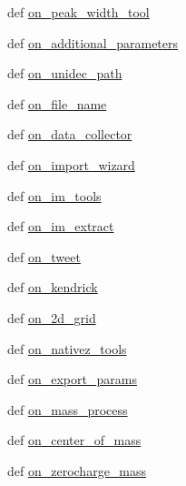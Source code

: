 \begin{DoxyCompactItemize}
\item 
def \hyperlink{class_uni_dec_1_1_g_uni_dec_1_1_uni_dec_app_a35b390ed7644a5652549e75e08f06f88}{on\+\_\+peak\+\_\+width\+\_\+tool}
\item 
def \hyperlink{class_uni_dec_1_1_g_uni_dec_1_1_uni_dec_app_a435c27080ab74c687cddf28429c77469}{on\+\_\+additional\+\_\+parameters}
\item 
def \hyperlink{class_uni_dec_1_1_g_uni_dec_1_1_uni_dec_app_af5bec633e6172fd9b1b00097215f25ce}{on\+\_\+unidec\+\_\+path}
\item 
def \hyperlink{class_uni_dec_1_1_g_uni_dec_1_1_uni_dec_app_a5df76099c18d4e4d02794b9d67a3d800}{on\+\_\+file\+\_\+name}
\item 
def \hyperlink{class_uni_dec_1_1_g_uni_dec_1_1_uni_dec_app_a47102b4d617a58fb709bb943546d6e39}{on\+\_\+data\+\_\+collector}
\item 
def \hyperlink{class_uni_dec_1_1_g_uni_dec_1_1_uni_dec_app_a0fb954bd1bbc5f8bebad4183b960de6b}{on\+\_\+import\+\_\+wizard}
\item 
def \hyperlink{class_uni_dec_1_1_g_uni_dec_1_1_uni_dec_app_aac0263c187aa91f3b3c99e2349b8c86f}{on\+\_\+im\+\_\+tools}
\item 
def \hyperlink{class_uni_dec_1_1_g_uni_dec_1_1_uni_dec_app_ad12183777d2b844489e929a8cf255349}{on\+\_\+im\+\_\+extract}
\item 
def \hyperlink{class_uni_dec_1_1_g_uni_dec_1_1_uni_dec_app_a445599c67bc59306796f4a0ff5617beb}{on\+\_\+tweet}
\item 
def \hyperlink{class_uni_dec_1_1_g_uni_dec_1_1_uni_dec_app_a9284f7596232672b76267694c0b2d3e5}{on\+\_\+kendrick}
\item 
def \hyperlink{class_uni_dec_1_1_g_uni_dec_1_1_uni_dec_app_a74bf8b884fa6a7b94c52b65ac8eef98b}{on\+\_\+2d\+\_\+grid}
\item 
def \hyperlink{class_uni_dec_1_1_g_uni_dec_1_1_uni_dec_app_a028e786c7a6c462a94d86fe3a3920eaf}{on\+\_\+nativez\+\_\+tools}
\item 
def \hyperlink{class_uni_dec_1_1_g_uni_dec_1_1_uni_dec_app_a7887226a98047864c7686ed8c1de3c27}{on\+\_\+export\+\_\+params}
\item 
def \hyperlink{class_uni_dec_1_1_g_uni_dec_1_1_uni_dec_app_ad35c06df6a8321d28ea5c4747b79f07f}{on\+\_\+mass\+\_\+process}
\item 
def \hyperlink{class_uni_dec_1_1_g_uni_dec_1_1_uni_dec_app_a8faf5c547d48d2b1174b7d254b20720a}{on\+\_\+center\+\_\+of\+\_\+mass}
\item 
def \hyperlink{class_uni_dec_1_1_g_uni_dec_1_1_uni_dec_app_a6682b98bc5de5ee5b8a12e69a6039f7f}{on\+\_\+zerocharge\+\_\+mass}

\end{DoxyCompactItemize}
